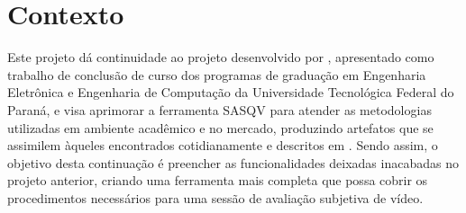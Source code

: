 \chapter{Contexto}

Este projeto dá continuidade ao projeto desenvolvido por \cite{sasqv}, apresentado como trabalho de conclusão de curso dos programas de graduação em Engenharia Eletrônica e Engenharia de Computação da Universidade Tecnológica Federal do Paraná, e visa aprimorar a ferramenta SASQV para atender as metodologias utilizadas em ambiente acadêmico e no mercado, produzindo artefatos que se assimilem àqueles encontrados cotidianamente e descritos em \cite{albini, vqeg}. 
Sendo assim, o objetivo desta continuação é preencher as funcionalidades deixadas inacabadas no projeto anterior, criando uma ferramenta mais completa que possa cobrir os procedimentos necessários para uma sessão de avaliação subjetiva de vídeo.
